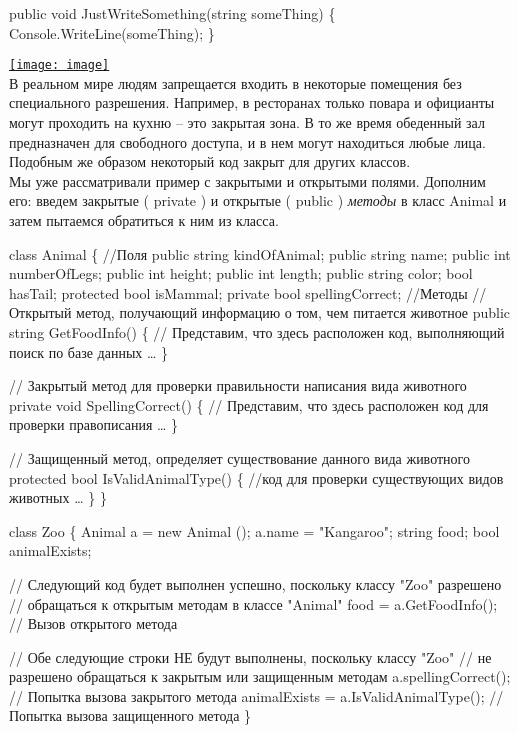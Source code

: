 \documentclass[12pt, a4paper]{article}
\begin{document}
\begin{spverbatim}public void JustWriteSomething(string someThing)
\{
    Console.WriteLine(someThing);
\}\end{spverbatim}


\bigbreak \href{http://www.intuit.ru//EDI/25_09_16_1/1474755579-437/tutorial/590/objects/3/files/02-25.jpg}                         {\texttt{[image: image]}}\\



В реальном мире людям запрещается входить в некоторые помещения без специального разрешения. Например, в ресторанах только повара и официанты могут проходить на кухню – это
закрытая зона. В то же время обеденный зал предназначен для свободного доступа, и в нем могут находиться любые лица. Подобным же образом некоторый код закрыт для других классов.\\

Мы уже рассматривали пример с закрытыми и открытыми полями. Дополним его: введем
закрытые ( private ) и открытые ( public ) \textit{методы}  в класс Animal  и затем пытаемся обратиться к
ним из класса.\\

\begin{spverbatim}class Animal
\{
    //Поля
    public string kindOfAnimal;
    public string name;
    public int numberOfLegs;
    public int height;
    public int length;
    public string color;
    bool hasTail;
    protected bool isMammal;
    private bool spellingCorrect;
    //Методы
    // Открытый метод, получающий информацию о том, чем питается животное
    public string GetFoodInfo()
    \{
    // Представим, что здесь расположен код, выполняющий поиск по базе данных
    …
    \}
    
    // Закрытый метод для проверки правильности написания вида животного
    private void SpellingCorrect()
    \{
    // Представим, что здесь расположен код для проверки правописания
    …
    \}
    
    // Защищенный метод, определяет существование данного вида животного
    protected bool IsValidAnimalType()
    \{
    //код для проверки существующих видов животных
    …
    \}
\}

class Zoo
\{
    Animal a = new Animal ();
    a.name = "Kangaroo";
    string food;
    bool animalExists;
    
    // Следующий код будет выполнен успешно, поскольку классу "Zoo" разрешено
    // обращаться к открытым методам в классе "Animal"
    food = a.GetFoodInfo(); // Вызов открытого метода
    
    // Обе следующие строки НЕ будут выполнены, поскольку классу "Zoo"
    // не разрешено обращаться к закрытым или защищенным методам
    a.spellingCorrect(); // Попытка вызова закрытого метода
    animalExists = a.IsValidAnimalType(); // Попытка вызова защищенного метода
\}\end{spverbatim}
\end{document}

